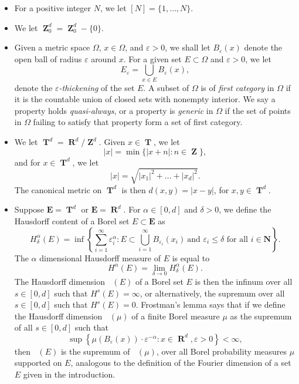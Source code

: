 \documentclass[12pt,reqno]{article}
\numberwithin{equation}{section}
\DeclareMathOperator{\hausdim}{\dim_{\mathbf{H}}}
\DeclareMathOperator{\RR}{\mathbf{R}}
\DeclareMathOperator{\ZZ}{\mathbf{Z}}
\DeclareMathOperator{\TT}{\mathbf{T}}
\begin{document}
\begin{itemize}
    \item For a positive integer $N$, we let $[N] = \{ 1, \dots, N \}$.

    \item We let $\ZZ^d_0 = \ZZ^d_0 - \{ 0 \}$.

    \item Given a metric space $\Omega$, $x \in \Omega$, and $\varepsilon > 0$, we shall let $B_\varepsilon(x)$ denote the open ball of radius $\varepsilon$ around $x$. For a given set $E \subset \Omega$ and $\varepsilon > 0$, we let
    \[ E_\varepsilon = \bigcup_{x \in E} B_\varepsilon(x), \]
    denote the \emph{$\varepsilon$-thickening} of the set $E$. A subset of $\Omega$ is of \emph{first category} in $\Omega$ if it is the countable union of closed sets with nonempty interior. We say a property holds \emph{quasi-always}, or a property is \emph{generic} in $\Omega$ if the set of points in $\Omega$ failing to satisfy that property form a set of first category.

    \item We let $\TT^d = \RR^d/\ZZ^d$. Given $x \in \TT$, we let
    \[ |x| = \min \{ |x + n| : n \in \ZZ \}, \]
    and for $x \in \TT^d$, we let
    \[ |x| = \sqrt{|x_1|^2 + \dots + |x_d|^2}. \]
    The canonical metric on $\TT^d$ is then $d(x,y) = |x - y|$, for $x,y \in \TT^d$.

    \item Suppose $\mathbf{E} = \TT^d$ or $\mathbf{E} = \RR^d$. For $\alpha \in [0,d]$ and $\delta > 0$, we define the Hausdorff content of a Borel set $E \subset \mathbf{E}$ as
    \[ H^\alpha_\delta(E) = \inf \left\{ \sum_{i = 1}^\infty \varepsilon_i^\alpha : E \subset \bigcup_{i = 1}^\infty B_{\varepsilon_i}(x_i)\ \text{and $\varepsilon_i \leq \delta$ for all $i \in \mathbf{N}$} \right\}. \]
    The $\alpha$ dimensional Hausdorff measure of $E$ is equal to
    \[ H^\alpha(E) = \lim_{\delta \to 0} H^\alpha_\delta(E). \]
    The Hausdorff dimension $\hausdim(E)$ of a Borel set $E$ is then the infinum over all $s \in [0,d]$ such that $H^s(E) = \infty$, or alternatively, the supremum over all $s \in [0,d]$ such that $H^s(E) = 0$. Frostman's lemma says that if we define the Hausdorff dimension $\hausdim(\mu)$ of a finite Borel measure $\mu$ as the supremum of all $s \in [0,d]$ such that
    \begin{equation} \label{hausdim}
        \sup \left\{ \mu(B_\varepsilon(x)) \cdot \varepsilon^{-\alpha} : x \in \RR^d, \varepsilon > 0 \right\} < \infty,
    \end{equation}
    then $\hausdim(E)$ is the supremum of $\hausdim(\mu)$, over all Borel probability measures $\mu$ supported on $E$, analogous to the definition of the Fourier dimension of a set $E$ given in the introduction.


\end{itemize}
\end{document}
